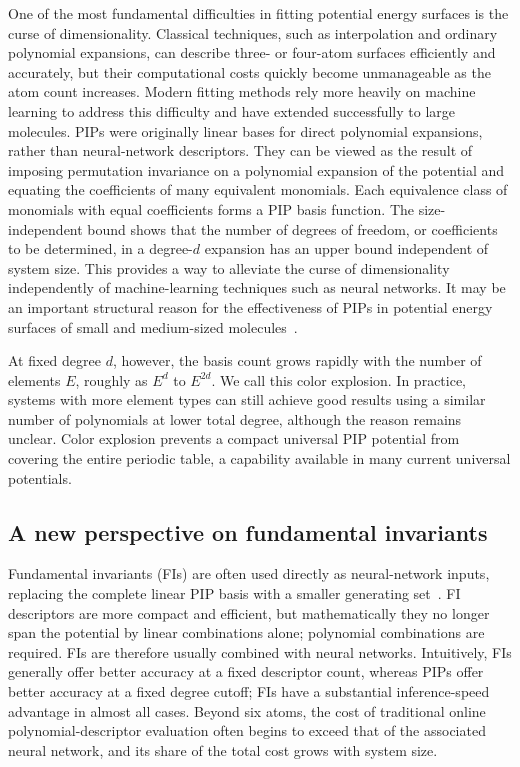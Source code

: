 One of the most fundamental difficulties in fitting potential energy surfaces is the curse of dimensionality. Classical techniques, such as interpolation and ordinary polynomial expansions, can describe three- or four-atom surfaces efficiently and accurately, but their computational costs quickly become unmanageable as the atom count increases. Modern fitting methods rely more heavily on machine learning to address this difficulty and have extended successfully to large molecules.
PIPs were originally linear bases for direct polynomial expansions, rather than neural-network descriptors. They can be viewed as the result of imposing permutation invariance on a polynomial expansion of the potential and equating the coefficients of many equivalent monomials. Each equivalence class of monomials with equal coefficients forms a PIP basis function. The size-independent bound shows that the number of degrees of freedom, or coefficients to be determined, in a degree-\(d\) expansion has an upper bound independent of system size. This provides a way to alleviate the curse of dimensionality independently of machine-learning techniques such as neural networks. It may be an important structural reason for the effectiveness of PIPs in potential energy surfaces of small and medium-sized molecules~\cite{Braams2009PIP,Xie2010MSA,Jiang2013PIPNN,Moberg2021PIPUnrestricted,Hao2025PIPFIAlgorithms}.

At fixed degree \(d\), however, the basis count grows rapidly with the number of elements \(E\), roughly as \(E^d\) to \(E^{2d}\). We call this color explosion. In practice, systems with more element types can still achieve good results using a similar number of polynomials at lower total degree, although the reason remains unclear. Color explosion prevents a compact universal PIP potential from covering the entire periodic table, a capability available in many current universal potentials.

\subsection{A new perspective on fundamental invariants}\label{sec:discussion-fundamental-invariants}

Fundamental invariants (FIs) are often used directly as neural-network inputs, replacing the complete linear PIP basis with a smaller generating set~\cite{Shao2016FINN,Chen2020FINN2,Fu2023FIReview}. FI descriptors are more compact and efficient, but mathematically they no longer span the potential by linear combinations alone; polynomial combinations are required. FIs are therefore usually combined with neural networks. Intuitively, FIs generally offer better accuracy at a fixed descriptor count, whereas PIPs offer better accuracy at a fixed degree cutoff; FIs have a substantial inference-speed advantage in almost all cases. Beyond six atoms, the cost of traditional online polynomial-descriptor evaluation often begins to exceed that of the associated neural network, and its share of the total cost grows with system size.

